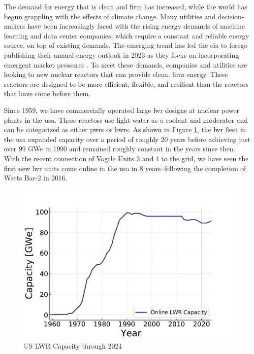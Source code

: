 The demand for energy that is clean and firm has increased, while the world has begun grappling with the effects of climate change. Many utilities and decision-makers have been increasingly faced with the rising energy demands of machine learning and data center companies, which require a constant and reliable energy source, on top of existing demands. The emerging trend has led the \gls{eia} to forego publishing their annual energy outlook in 2023 as they focus on incorporating emergent market pressures \cite{eia_annual_outlook_canceled_2023}. To meet these demands, companies and utilities are looking to new nuclear reactors that can provide clean, firm energy. These reactors are designed to be more efficient, flexible, and resilient than the reactors that have come before them.

Since 1959, we have commercially operated large \gls{lwr} designs at nuclear power plants in the \gls{usa}. These reactors use light water as a coolant and moderator and can be categorized as either \gls{pwr}s or \gls{bwr}s. As shown in Figure \ref{fig:online_lwr_cap_2024}, the \gls{lwr} fleet in the \gls{usa} expanded capacity over a period of roughly 20 years before achieving just over 99 GWe in 1990 and remained roughly constant in the years since then. With the recent connection of Vogtle Units 3 and 4 to the grid, we have seen the first new \gls{lwr} units come online in the \gls{usa} in 8 years--following the completion of Watts Bar-2 in 2016.

\begin{figure}[htbp]
    \centering
    \includegraphics[scale=0.8]{images/intro/online_lwr_cap_2024.pdf}
    \caption{US LWR Capacity through 2024 \cite{IAEA_PRIS}}
    \label{fig:online_lwr_cap_2024}
\end{figure}

